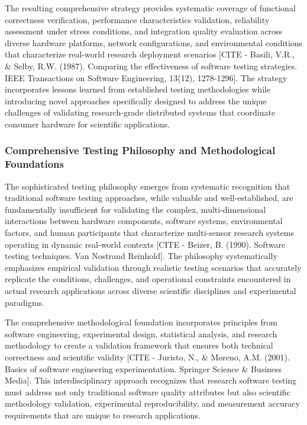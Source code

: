 \documentclass[12pt,a4paper]{report}
\begin{document}
The resulting comprehensive strategy provides systematic coverage of functional correctness verification, performance
characteristics validation, reliability assessment under stress conditions, and integration quality evaluation across
diverse hardware platforms, network configurations, and environmental conditions that characterize real-world research
deployment
scenarios [CITE - Basili, V.R., \& Selby, R.W. (1987). Comparing the effectiveness of software testing strategies. IEEE Transactions on Software Engineering, 13(12), 1278-1296].
The strategy incorporates lessons learned from established testing methodologies while introducing novel approaches
specifically designed to address the unique challenges of validating research-grade distributed systems that coordinate
consumer hardware for scientific applications.

\subsubsection{Comprehensive Testing Philosophy and Methodological Foundations}

The sophisticated testing philosophy emerges from systematic recognition that traditional software testing approaches,
while valuable and well-established, are fundamentally insufficient for validating the complex, multi-dimensional
interactions between hardware components, software systems, environmental factors, and human participants that
characterize multi-sensor research systems operating in dynamic real-world
contexts [CITE - Beizer, B. (1990). Software testing techniques. Van Nostrand Reinhold]. The philosophy systematically
emphasizes empirical validation through realistic testing scenarios that accurately replicate the conditions,
challenges, and operational constraints encountered in actual research applications across diverse scientific
disciplines and experimental paradigms.

The comprehensive methodological foundation incorporates principles from software engineering, experimental design,
statistical analysis, and research methodology to create a validation framework that ensures both technical correctness
and scientific
validity [CITE - Juristo, N., \& Moreno, A.M. (2001). Basics of software engineering experimentation. Springer Science \& Business Media].
This interdisciplinary approach recognizes that research software testing must address not only traditional software
quality attributes but also scientific methodology validation, experimental reproducibility, and measurement accuracy
requirements that are unique to research applications.
\end{document}
